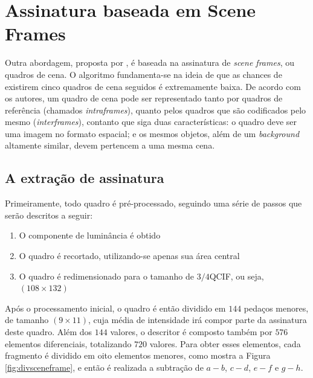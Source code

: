 \section{Assinatura baseada em Scene Frames}


Outra abordagem, proposta por \cite{mao2015sceneframe}, é baseada na assinatura de \textit{scene frames}, ou quadros de cena. O algoritmo fundamenta-se na ideia de que as chances de existirem cinco quadros de cena seguidos é extremamente baixa. De acordo com os autores, um quadro de cena pode ser representado tanto por quadros de referência (chamados \textit{intraframes}), quanto pelos quadros que são codificados pelo mesmo (\textit{interframes}), contanto que siga duas características: o quadro deve ser uma imagem no formato espacial; e os mesmos objetos, além de um \textit{background} altamente similar, devem pertencem a uma mesma cena.

\subsection{A extração de assinatura}

Primeiramente, todo quadro é pré-processado, seguindo uma série de passos que serão descritos a seguir:

\begin{enumerate}
	\item O componente de luminância é obtido
   	\item O quadro é recortado, utilizando-se apenas sua área central
    \item O quadro é redimensionado para o tamanho de $3/4$QCIF, ou seja, $(108\times132)$
\end{enumerate}

Após o processamento inicial, o quadro é então dividido em $144$ pedaços menores, de tamanho $(9\times11)$, cuja média de intensidade irá compor parte da assinatura deste quadro. Além dos $144$ valores, o descritor é composto também por $576$ elementos diferenciais, totalizando $720$ valores. Para obter esses elementos, cada fragmento é dividido em oito elementos menores, como mostra a Figura \ref{fig:divsceneframe}, e então é realizada a subtração de $a - b$, $c - d$, $e - f$ e $g - h$.


